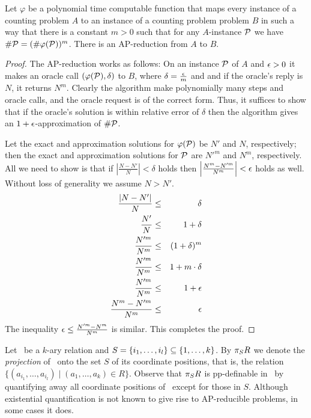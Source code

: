 \begin{lemma}\label{lem:logarithm}
Let \(\varphi\) be a polynomial time computable function that maps every instance of a
counting problem \(A\) to an instance of a counting problem problem \(B\) in such a way that
there is a constant \(m>0\) such that
for any \(A\)-instance \(\mathcal{P}\) we have
\(\#\mathcal{P} = (\#\varphi(\mathcal{P}))^m\)\@.
There is an AP-reduction from \(A\) to \(B\)\@.
\end{lemma}

\begin{proof}
The AP-reduction works as follows: On an instance \(\mathcal{P}\) of \(A\) and \(\epsilon > 0\) it makes 
an oracle call \((\varphi(\mathcal{P}),\delta)\) to \(B\), where \(\delta = \frac{\epsilon}{m}\) and 
and if the oracle's reply is \(N\), it returns \(N^m\)\@. Clearly the algorithm make polynomially 
many steps and oracle calls, and the oracle request is of the correct form.
Thus, it suffices to show that if the oracle's solution is within relative error of \(\delta\) then
the algorithm gives an \(1+\epsilon\)-approximation of \(\#\mathcal{P}\)\@.

Let the exact and approximation solutions for \(\varphi(\mathcal{P})\) be \(N'\) and \(N\), respectively;
then the exact and approximation solutions for \(\mathcal{P}\) are  
\(N'^m\) and \(N^m\), respectively.
All we need to show is that if \(\left|\frac{N-N'}{N}\right|<\delta\) holds then
\(\left|\frac{N^m-N'^m}{N^m}\right|<\epsilon\) holds as well. Without loss of generality we assume
\(N>N'\).
\begin{eqnarray*}
\frac{|N-N'|}{N} & \le & \delta \\
\frac{N'}{N} & \le & 1 + \delta \\
\frac{N'^m}{N^m} & \le & (1 + \delta) ^ m\\
\frac{N'^m}{N^m} & \le & 1 + m\cdot\delta \\
\frac{N'^m}{N^m} & \le & 1 + \epsilon \\
\frac{N^m - N'^m}{N^m} & \le & \epsilon
\end{eqnarray*}
The inequality \(\epsilon \le \frac{N'^m - N^m}{N^m}\) is similar.
This completes the proof.
\end{proof}

Let \mR\ be a \(k\)-ary relation and \(S=\{{i_1,\dotsc,i_l}\} \subseteq \{{1,\dotsc,k}\}\)\@.
By \(\pi_{S}{R}\) we denote the \emph{projection} of \mR\ onto the set \(S\) of its coordinate
positions, that is, the relation \(\{(a_{i_1},\dotsc,a_{i_l}) \mid (a_1,\dotsc,a_k)\in R\}\)\@.
Observe that \(\pi_{S}{R}\) is pp-definable in \mR\ by quantifying away all coordinate
positions of \mR\ except for those in \(S\)\@.
Although existential quantification is not known to give rise to AP-reducible problems, in some
cases it does.

